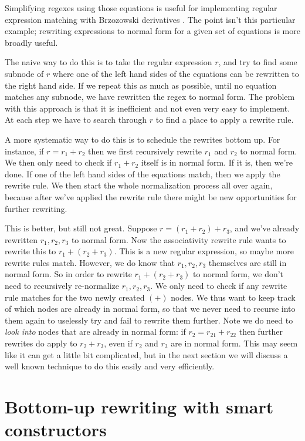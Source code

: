 Simplifying regexes using those equations is useful for implementing regular expression matching with Brzozowski derivatives \cite{brzozowski64,owens_reppy_turon_2009}.
The point isn't this particular example; rewriting expressions to normal form for a given set of equations is more broadly useful.

The naive way to do this is to take the regular expression $r$, and try to find some subnode of $r$ where one of the left hand sides of the equations can be rewritten to the right hand side.
If we repeat this as much as possible, until no equation matches any subnode, we have rewritten the regex to normal form.
The problem with this approach is that it is inefficient and not even very easy to implement. At each step we have to search through $r$ to find a place to apply a rewrite rule.

A more systematic way to do this is to schedule the rewrites bottom up. For instance, if $r = r_1 + r_2$ then we first recursively rewrite $r_1$ and $r_2$ to normal form. We then only need to check if $r_1 + r_2$ itself is in normal form. If it is, then we're done. If one of the left hand sides of the equations match, then we apply the rewrite rule. We then start the whole normalization process all over again, because after we've applied the rewrite rule there might be new opportunities for further rewriting.

This is better, but still not great. Suppose $r = (r_1 + r_2) + r_3$, and we've already rewritten $r_1,r_2,r_3$ to normal form. Now the associativity rewrite rule wants to rewrite this to $r_1 + (r_2 + r_3)$. This is a new regular expression, so maybe more rewrite rules match. However, we do know that $r_1, r_2, r_3$ themselves are still in normal form. So in order to rewrite $r_1 + (r_2 + r_3)$ to normal form, we don't need to recursively re-normalize $r_1, r_2, r_3$. We only need to check if any rewrite rule matches for the two newly created $(+)$ nodes. We thus want to keep track of which nodes are already in normal form, so that we never need to recurse into them again to uselessly try and fail to rewrite them further. Note we do need to \emph{look into} nodes that are already in normal form: if $r_2 = r_{21} + r_{22}$ then further rewrites do apply to $r_2 + r_3$, even if $r_2$ and $r_3$ are in normal form. This may seem like it can get a little bit complicated, but in the next section we will discuss a well known technique to do this easily and very efficiently.



\section{Bottom-up rewriting with smart constructors}

